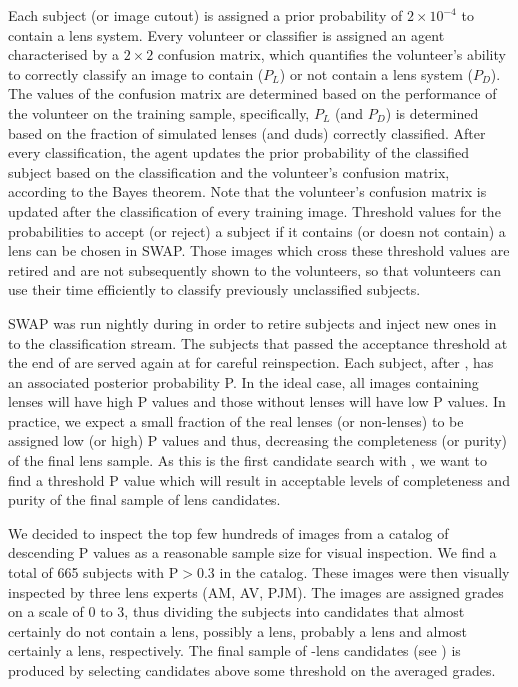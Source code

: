 \documentclass[useAMS,usenatbib,a4paper]{mn2e}
\begin{document}
Each subject (or image cutout) is assigned a prior probability of
$2\times10^{-4}$ to contain a lens system. Every volunteer or classifier
is assigned an agent characterised by a $2\times2$ confusion matrix,
which quantifies the volunteer's ability to correctly classify an image
to contain ($P_L$) or not contain a lens system ($P_D$). The values of
the confusion matrix are determined based on the performance of the
volunteer on the training sample, specifically, $P_L$ (and $P_D$) is
determined based on the fraction of simulated lenses (and duds)
correctly classified. After every classification, the agent updates the
prior probability of the classified subject based on the classification
and the volunteer's confusion matrix, according to the Bayes theorem.
Note that the volunteer's confusion matrix is updated after the
classification of every training image. Threshold values for the
probabilities to accept (or reject) a subject  if it contains (or doesn
not contain) a lens can be chosen in SWAP. Those images which cross
these threshold values are retired and are not subsequently shown to the
volunteers, so that volunteers can use their time efficiently to
classify previously unclassified subjects.

SWAP was run nightly during \StageOne in order to retire subjects and inject new
ones in to the classification stream. The subjects that passed the acceptance
threshold at the end of \StageOne are served again at \StageTwo for careful
reinspection. Each subject, after \StageTwo, has an associated posterior
probability P. In the ideal case, all images containing lenses will have high P
values and those without lenses will have low P values. In practice, we expect a
small fraction of the real lenses (or non-lenses) to be assigned low (or high) P
values and thus, decreasing the completeness (or purity) of the final lens
sample.  As this is the first candidate search with \sw, we want to find a
threshold P value which will result in acceptable levels of completeness and
purity of the final sample of lens candidates.

We decided to inspect the top few hundreds of images from a catalog of
descending P values as a reasonable sample size for visual inspection.
We find a total of 665 subjects with P$>0.3$ in the catalog. These
images were then visually inspected by three lens experts (AM, AV, PJM).
The images are assigned grades on a scale of 0 to 3, thus dividing the
subjects into candidates that almost certainly do not contain a lens,
possibly a lens, probably a lens and almost certainly a lens,
respectively. The final sample of \sw-\cfhtls lens candidates (see
) is produced by selecting candidates above some
threshold on the averaged grades.
\end{document}
